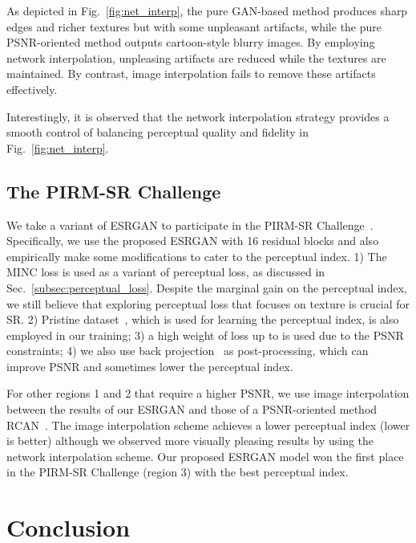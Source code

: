 \documentclass[runningheads]{llncs}
\begin{document}
As depicted in Fig.~\ref{fig:net_interp}, the pure GAN-based method produces sharp edges and richer textures but with 
some unpleasant artifacts, while the pure PSNR-oriented method outputs cartoon-style blurry images.
By employing network interpolation, unpleasing artifacts are reduced while the textures are maintained. 
By contrast, image interpolation fails to remove these artifacts effectively.

Interestingly, it is observed that the network interpolation strategy provides a smooth control of balancing 
perceptual quality and fidelity in Fig.~\ref{fig:net_interp}.


\subsection{The PIRM-SR Challenge} \label{sec:prim18}
We take a variant of ESRGAN to participate in the PIRM-SR Challenge~\cite{pirm18url}.
Specifically, we use the proposed ESRGAN with 16 residual blocks and also empirically make some modifications to cater 
to the perceptual index.
1) The MINC loss is used as a variant of perceptual loss, as discussed in Sec.~\ref{subsec:perceptual_loss}. 
Despite the marginal gain on the perceptual index, we still believe that exploring perceptual loss that focuses on 
texture is 
crucial for SR.
2) Pristine dataset~\cite{mittal2013making}, which is used for learning the perceptual index, is also employed in our 
training;
3) a high weight of loss  up to  is used due to the PSNR constraints;
4) we also use back projection~\cite{timofte2016seven} as post-processing, which can improve PSNR and sometimes 
lower the perceptual index.


For other regions 1 and 2 that require a higher PSNR, we use image interpolation between the results of our ESRGAN and  
those of a PSNR-oriented method RCAN~\cite{zhang2018image}. 
The image interpolation scheme achieves a lower perceptual index (lower is better) although we observed more visually 
pleasing results by using the network interpolation scheme.
Our proposed ESRGAN model won the first place in the PIRM-SR Challenge (region 3) with the best perceptual index.


\section{Conclusion}
\end{document}
